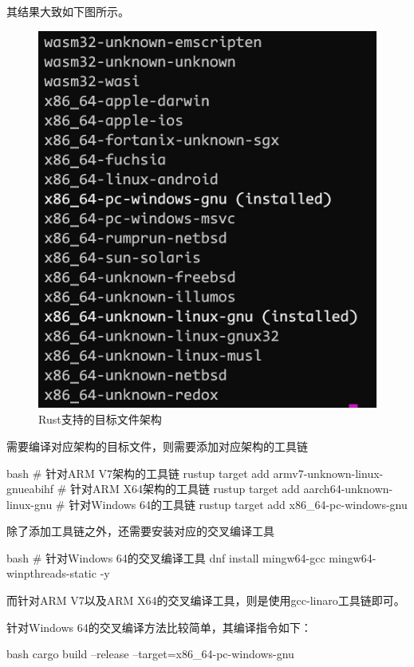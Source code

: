 其结果大致如下图所示。
\begin{figure}[H]
  \centering
  \includegraphics[scale=0.5]{rust_target.png}
  \caption{Rust支持的目标文件架构}
  \label{fig:rust_target}
\end{figure}

需要编译对应架构的目标文件，则需要添加对应架构的工具链
\begin{code-block}{bash}
# 针对ARM V7架构的工具链
rustup target add armv7-unknown-linux-gnueabihf
# 针对ARM X64架构的工具链
rustup target add aarch64-unknown-linux-gnu
# 针对Windows 64的工具链
rustup target add x86_64-pc-windows-gnu
\end{code-block}

除了添加工具链之外，还需要安装对应的交叉编译工具
\begin{code-block}{bash}
# 针对Windows 64的交叉编译工具
dnf install mingw64-gcc mingw64-winpthreads-static -y
\end{code-block}

而针对ARM V7以及ARM X64的交叉编译工具，则是使用gcc-linaro工具链即可。

针对Windows 64的交叉编译方法比较简单，其编译指令如下：
\begin{code-block}{bash}
cargo build --release --target=x86_64-pc-windows-gnu
\end{code-block}

